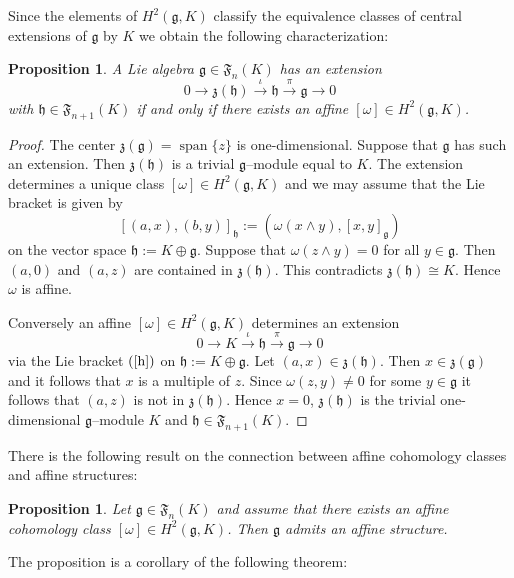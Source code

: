 \documentclass[12pt]{amsart}
\newtheorem{prop}[thm]{Proposition}
\theoremstyle{definition}
\theoremstyle{remark}
\DeclareMathOperator{\s}{span}
\newcommand{\Lg}{\mathfrak{g}}
\newcommand{\Lh}{\mathfrak{h}}
\newcommand{\Lz}{\mathfrak{z}}
\newcommand{\LF}{\mathfrak{F}}
\newcommand{\om}{\omega}
\begin{document}
Since the elements of $H^2(\Lg,K)$ classify the equivalence
classes of central extensions of $\Lg$ by $K$ we obtain the following
characterization:

\begin{prop} \label{h2}
A Lie algebra $\Lg\in\LF_n(K)$ has an extension
\begin{equation} \label{zen}
0 \rightarrow \Lz (\Lh) \xrightarrow{\iota} \Lh \xrightarrow{\pi}
\Lg \rightarrow 0
\end{equation}
with $\Lh \in \LF_{n+1}(K)$ if and only if there exists an affine
$[\om]\in H^2(\Lg,K)$.
\end{prop}
\begin{proof}
The center $\Lz(\Lg)=\s \{z \}$ is one-dimensional.
Suppose that $\Lg$ has such an extension. Then $\Lz (\Lh)$ is a trivial
$\Lg$--module equal to $K$.
The extension determines a unique class $[\om] \in H^2(\Lg,K)$
and we may assume that the Lie bracket is given by
\begin{equation}
\label{h}
[(a,x),(b,y)]_{\Lh}:=(\om (x\wedge y),[x,y]_{\Lg})
\end{equation}
on the vector space $\Lh:=K\oplus \Lg$.
Suppose that $\om(z \wedge y)=0$ for all $y\in \Lg$. Then
$(a,0)$ and $(a,z)$ are contained in $\Lz (\Lh)$. This contradicts
$\Lz(\Lh)\cong K$. Hence $\om$ is affine.

Conversely an affine $[\om]\in H^2(\Lg,K)$ determines an extension
\begin{equation*}
0 \rightarrow K \xrightarrow{\iota} \Lh \xrightarrow{\pi}
\Lg \rightarrow 0
\end{equation*}
via the Lie bracket $(\ref{h})$
on $\Lh:=K\oplus \Lg$. Let $(a,x)\in \Lz (\Lh)$.
Then $x\in \Lz(\Lg)$ and it follows that $x$ is a multiple of $z$.
Since $\om (z,y) \ne 0$ for some $y\in \Lg$ it follows that
$(a,z)$ is not in $\Lz (\Lh)$. Hence $x=0$, $\Lz (\Lh)$ is the trivial
one-dimensional $\Lg$--module $K$ and $\Lh \in \LF_{n+1}(K)$.
\end{proof}

There is the following result on the connection between affine
cohomology classes and affine structures:

\begin{prop}
Let $\Lg\in\LF_n(K)$ and assume that there exists an affine cohomology class
$[\om]\in H^2(\Lg,K)$. Then $\Lg$ admits an affine structure.
\end{prop}

The proposition is a corollary of the following theorem:
\end{document}
